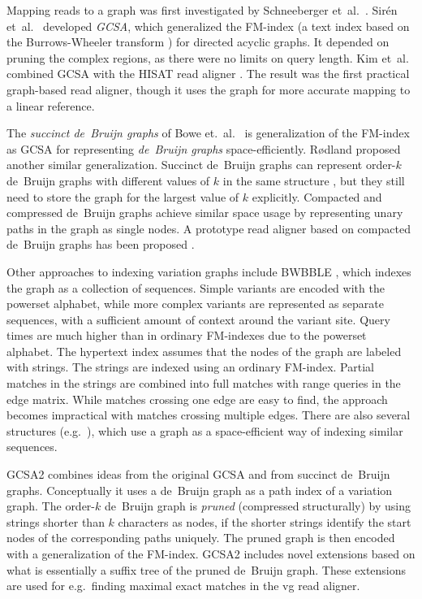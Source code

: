 \documentclass[a4paper,UKenglish]{lipics-v2016}
\newcommand{\orderk}[1]{order\nobreakdash-$#1$}
\begin{document}
Mapping reads to a graph was first investigated by Schneeberger et~al.~\cite{Schneeberger2009}. Sirén et~al.~\cite{Siren2014} developed \emph{GCSA}, which generalized the FM\nobreakdash-index \cite{Ferragina2005a} (a text index based on the Burrows-Wheeler transform \cite{Burrows1994}) for directed acyclic graphs. It depended on pruning the complex regions, as there were no limits on query length. Kim et~al.~\cite{Kim2015-2016} combined GCSA with the HISAT read aligner \cite{Kim2015}. The result was the first practical graph-based read aligner, though it uses the graph for more accurate mapping to a linear reference.

The \emph{succinct de~Bruijn graphs} of Bowe et.~al.~\cite{Bowe2012} is generalization of the FM\nobreakdash-index as GCSA for representing \emph{de~Bruijn graphs} space-efficiently. Rødland \cite{Roedland2013} proposed another similar generalization. Succinct de~Bruijn graphs can represent \orderk{k} de~Bruijn graphs with different values of $k$ in the same structure \cite{Boucher2014}, but they still need to store the graph for the largest value of $k$ explicitly. Compacted \cite{Cazaux2014} and compressed de~Bruijn graphs \cite{Marcus2014} achieve similar space usage by representing unary paths in the graph as single nodes. A prototype read aligner based on compacted de~Bruijn graphs has been proposed \cite{Limasset2015}.

Other approaches to indexing variation graphs include BWBBLE \cite{Huang2013}, which indexes the graph as a collection of sequences. Simple variants are encoded with the powerset alphabet, while more complex variants are represented as separate sequences, with a sufficient amount of context around the variant site. Query times are much higher than in ordinary FM\nobreakdash-indexes due to the powerset alphabet. The hypertext index \cite{Thachuk2013} assumes that the nodes of the graph are labeled with strings. The strings are indexed using an ordinary FM-index. Partial matches in the strings are combined into full matches with range queries in the edge matrix. While matches crossing one edge are easy to find, the approach becomes impractical with matches crossing multiple edges. There are also several structures (e.g.~\cite{Huang2010,Wandelt2013,Danek2014,Na2015}), which use a graph as a space-efficient way of indexing similar sequences.

GCSA2 combines ideas from the original GCSA and from succinct de~Bruijn graphs. Conceptually it uses a de~Bruijn graph as a path index of a variation graph. The \orderk{k} de~Bruijn graph is \emph{pruned} (compressed structurally) by using strings shorter than $k$ characters as nodes, if the shorter strings identify the start nodes of the corresponding paths uniquely. The pruned graph is then encoded with a generalization of the FM\nobreakdash-index. GCSA2 includes novel extensions based on what is essentially a suffix tree of the pruned de~Bruijn graph. These extensions are used for e.g.~finding maximal exact matches in the vg read aligner.
\end{document}
